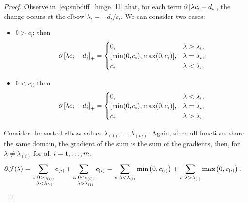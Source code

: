 \begin{proof}
    Observe in~\eqref{eq:subdiff_hinge_l1} that, for each term $\partial \left|\lambda c_i + d_i\right|$, the change occurs at the elbow $\lambda_{i} = - d_ i / c_i$. We can consider two cases:
    \begin{itemize}
        \item $0 > c_i$; then
        \begin{equation}
            \nonumber
            \begin{aligned}
                \partial \left[\lambda c_i + d_i\right]_{+} = 
            \begin{cases}
                0 ,& \lambda > \lambda_i, \\
                [\min(0, c_i), \max(0, c_i)] ,& \lambda = \lambda_i, \\
                {c_i} ,& \lambda < \lambda_i .\\
            \end{cases}
            \end{aligned}
        \end{equation}
        \item $0 < c_i$; then
        \begin{equation}
            \nonumber
            \begin{aligned}
                \partial \left[\lambda c_i + d_i\right]_{+} = 
            \begin{cases}
                0 ,& \lambda < \lambda_i, \\
                [\min(0, c_i), \max(0, c_i)] ,& \lambda = \lambda_i, \\
                {c_i} ,& \lambda > \lambda_i .\\
            \end{cases}
            \end{aligned}
        \end{equation}
    \end{itemize}
    Consider the sorted elbow values $\lambda_{(1)}, \ldots, \lambda_{(m)}$.
    Again, since all functions share the same domain, the gradient of the sum is the sum of the gradients, then, for $\lambda \neq \lambda_{(i)}$ for all $i=1,\ldots,m$,
    \begin{equation}\nonumber
        \begin{aligned}
            \partial \mathcal{J}(\lambda) &=  \sum_{\substack{i:\; 0 > c_{(i)},\\ \;\; \lambda < \lambda_{(i)}}} {c_{(i)}} + \sum_{\substack{i:\; 0 < c_{(i)},\\ \;\; \lambda > \lambda_{(i)}}} {c_{(i)}}  = \sum_{i: \; \lambda < \lambda_{(i)}} \mymin{0, c_{(i)}} + \sum_{i: \; \lambda > \lambda_{(i)}} \mymax{0, c_{(i)}} .

\end{aligned}
\end{equation}
\end{proof}
